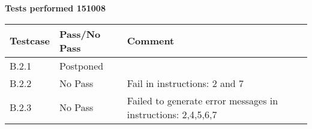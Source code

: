 \renewcommand{\testdate}{151008}
\textbf{Tests performed \testdate}
\begin{center}
  		\begin{tabular}{| p{3cm} | p{5cm} | p{5cm} |}
    		\hline
	    	\textbf{Testcase}			& \textbf{Pass/No Pass} 	& \textbf{Comment} \\ \hline
    		B.2.1		 						& Postponed 										&  				\\ \hline
    		B.2.2		 						& No Pass 										& Fail in instructions: 2 and 7				 \\	\hline
    		B.2.3		 						& No Pass 										& Failed to generate error messages in instructions: 2,4,5,6,7 				 \\	\hline
 		\end{tabular}
\end{center}